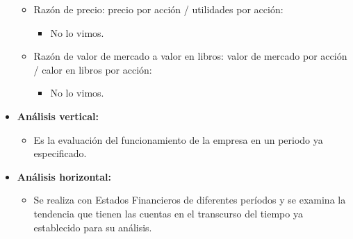 \documentclass{article}
\begin{document}
\begin{itemize}
\begin{itemize}
            \item Razón de precio: precio por acción / utilidades por acción: 
                \begin{itemize}
                    \item No lo vimos. 
                \end{itemize}
                
            \item Razón de valor de mercado a valor en libros: valor de mercado por acción / calor en libros por acción: 
                \begin{itemize}
                    \item No lo vimos. 
                \end{itemize}
        \end{itemize}
    \item \large\textbf{Análisis vertical: }\normalsize
        \begin{itemize}
            \item Es la evaluación del funcionamiento de la empresa en un periodo ya especificado.
        \end{itemize}
    
    \item \large\textbf{Análisis horizontal: }\normalsize
        \begin{itemize}
            \item Se realiza con Estados Financieros de diferentes períodos y se examina la tendencia que tienen las cuentas en el transcurso del tiempo ya establecido para su análisis.
        \end{itemize}
\end{itemize}
\end{document}
